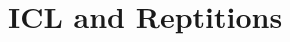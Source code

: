 \documentclass{article} %
\def\elliott#1{{\color{cyan}{\bf [Elliott:} {{#1}}{\bf ]}}}
\begin{document}



\section{ICL and Reptitions}
\label{sec:preliminary}

\end{document}
